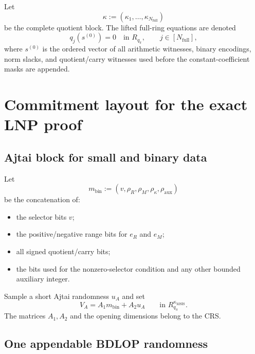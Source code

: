 \documentclass[11pt,a4paper]{article}
\newcommand{\Rpi}{R_{q_{\pi}}}
\begin{document}
Let
\[
  \kappa:=(\kappa_1,\ldots,\kappa_{N_{\mathrm{full}}})
\]
be the complete quotient block.  The lifted full-ring equations are denoted
\[
  q_j(s^{(0)})=0\quad\text{in }\Rpi,
  \qquad j\in[N_{\mathrm{full}}],
\]
where \(s^{(0)}\) is the ordered vector of all arithmetic witnesses, binary
encodings, norm slacks, and quotient/carry witnesses used before the
constant-coefficient masks are appended.

\section{Commitment layout for the exact LNP proof}

\subsection{Ajtai block for small and binary data}

Let
\begin{equation}
  m_{\mathrm{bin}}
   :=(v,\rho_R,\rho_M,\rho_\kappa,\rho_{\mathrm{aux}})
  \label{eq:mbin}
\end{equation}
be the concatenation of:
\begin{itemize}
  \item the selector bits \(v\);
  \item the positive/negative range bits for \(e_R\) and \(e_M\);
  \item all signed quotient/carry bits;
  \item the bits used for the nonzero-selector condition and any other bounded
  auxiliary integer.
\end{itemize}
Sample a short Ajtai randomness \(u_A\) and set
\begin{equation}
  V_A=A_1m_{\mathrm{bin}}+A_2u_A
  \qquad\text{in }\Rpi^{\kappa_{\mathrm{MSIS}}}.
  \label{eq:Ajtai-commitment}
\end{equation}
The matrices \(A_1,A_2\) and the opening dimensions belong to the CRS.

\subsection{One appendable BDLOP randomness}
\end{document}
